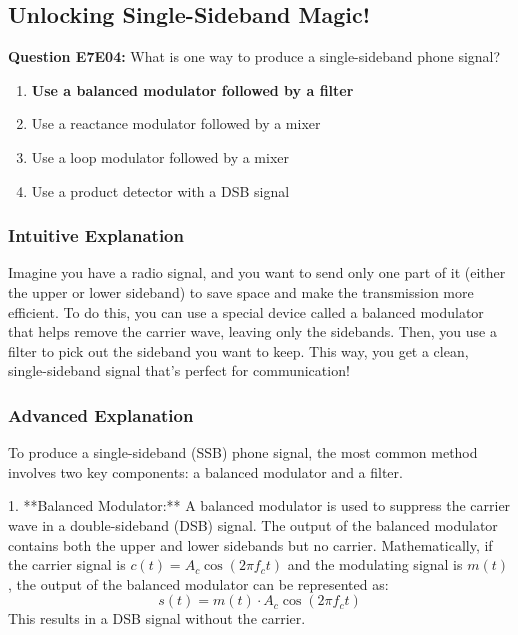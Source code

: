\subsection{Unlocking Single-Sideband Magic!}
\label{sec:E7E04}

\begin{tcolorbox}[colback=blue!5!white,colframe=blue!75!black]
    \textbf{Question E7E04:} What is one way to produce a single-sideband phone signal?
    
    \begin{enumerate}[label=\Alph*)]
        \item \textbf{Use a balanced modulator followed by a filter}
        \item Use a reactance modulator followed by a mixer
        \item Use a loop modulator followed by a mixer
        \item Use a product detector with a DSB signal
    \end{enumerate}
\end{tcolorbox}

\subsubsection{Intuitive Explanation}
Imagine you have a radio signal, and you want to send only one part of it (either the upper or lower sideband) to save space and make the transmission more efficient. To do this, you can use a special device called a balanced modulator that helps remove the carrier wave, leaving only the sidebands. Then, you use a filter to pick out the sideband you want to keep. This way, you get a clean, single-sideband signal that’s perfect for communication!

\subsubsection{Advanced Explanation}
To produce a single-sideband (SSB) phone signal, the most common method involves two key components: a balanced modulator and a filter. 

1. **Balanced Modulator:** A balanced modulator is used to suppress the carrier wave in a double-sideband (DSB) signal. The output of the balanced modulator contains both the upper and lower sidebands but no carrier. Mathematically, if the carrier signal is \( c(t) = A_c \cos(2\pi f_c t) \) and the modulating signal is \( m(t) \), the output of the balanced modulator can be represented as:
   \[
   s(t) = m(t) \cdot A_c \cos(2\pi f_c t)
   \]
   This results in a DSB signal without the carrier.

